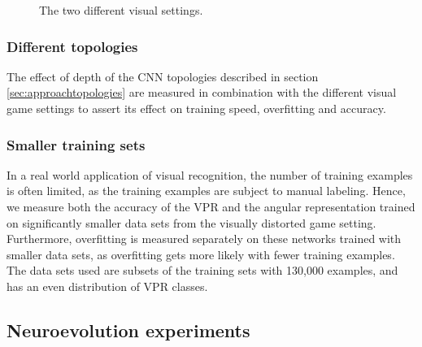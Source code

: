 \begin{figure}[H]
	\begin{scriptsize}
		
	\end{scriptsize}
	\caption{The two different visual settings.}
	\label{fig:light}
\end{figure}

\subsubsection{Different topologies}
The effect of depth of the CNN topologies described in section \ref{sec:approachtopologies} are measured in combination with the different visual game settings to assert its effect on training speed, overfitting and accuracy.

\subsubsection{Smaller training sets}
In a real world application of visual recognition, the number of training examples is often limited, as the training examples are subject to manual labeling. Hence, we measure both the accuracy of the VPR and the angular representation trained on significantly smaller data sets from the visually distorted game setting. Furthermore, overfitting is measured separately on these networks trained with smaller data sets, as overfitting gets more likely with fewer training examples. The data sets used are subsets of the training sets with 130,000 examples, and has an even distribution of VPR classes.

 
\subsection{Neuroevolution experiments}









